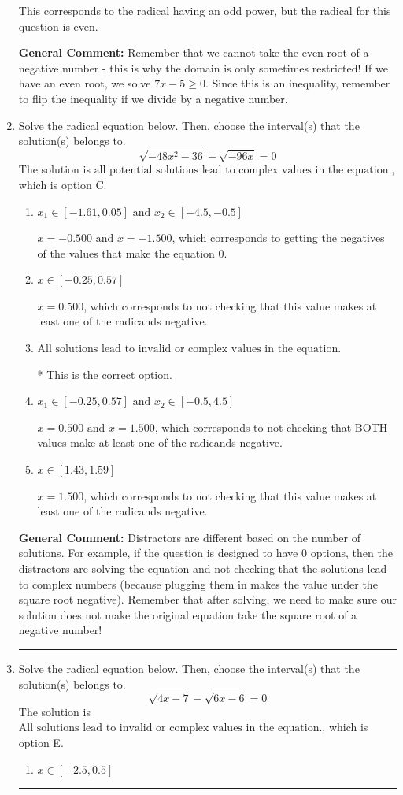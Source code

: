\documentclass{extbook}[14pt]
\newcommand{\litem}[1]{\item #1

\rule{\textwidth}{0.4pt}}
\begin{document}
\begin{enumerate}
{\begin{enumerate}[label=\Alph*.]
This corresponds to the radical having an odd power, but the radical for this question is even.
\end{enumerate}

\textbf{General Comment:} Remember that we cannot take the even root of a negative number - this is why the domain is only sometimes restricted! If we have an even root, we solve $7 x - 5 \geq 0$. Since this is an inequality, remember to flip the inequality if we divide by a negative number.
}
\litem{
Solve the radical equation below. Then, choose the interval(s) that the solution(s) belongs to.
\[ \sqrt{-48 x^2 - 36} - \sqrt{-96 x} = 0 \]The solution is \( \text{all potential solutions lead to complex values in the equation.} \), which is option C.\begin{enumerate}[label=\Alph*.]
\item \( x_1 \in [-1.61, 0.05] \text{ and } x_2 \in [-4.5,-0.5] \)

$x = -0.500 \text{ and } x = -1.500$, which corresponds to getting the negatives of the values that make the equation 0.
\item \( x \in [-0.25,0.57] \)

$x = 0.500$, which corresponds to not checking that this value makes at least one of the radicands negative.
\item \( \text{All solutions lead to invalid or complex values in the equation.} \)

* This is the correct option.
\item \( x_1 \in [-0.25, 0.57] \text{ and } x_2 \in [-0.5,4.5] \)

$x = 0.500 \text{ and } x = 1.500$, which corresponds to not checking that BOTH values make at least one of the radicands negative.
\item \( x \in [1.43,1.59] \)

$x = 1.500$, which corresponds to not checking that this value makes at least one of the radicands negative.
\end{enumerate}

\textbf{General Comment:} Distractors are different based on the number of solutions. For example, if the question is designed to have 0 options, then the distractors are solving the equation and not checking that the solutions lead to complex numbers (because plugging them in makes the value under the square root negative). Remember that after solving, we need to make sure our solution does not make the original equation take the square root of a negative number!
}
\litem{
Solve the radical equation below. Then, choose the interval(s) that the solution(s) belongs to.
\[ \sqrt{4 x - 7} - \sqrt{6 x - 6} = 0 \]The solution is \( \text{All solutions lead to invalid or complex values in the equation.} \), which is option E.\begin{enumerate}[label=\Alph*.]
\item \( x \in [-2.5,0.5] \)


\end{enumerate}}
\end{enumerate}
\end{document}
